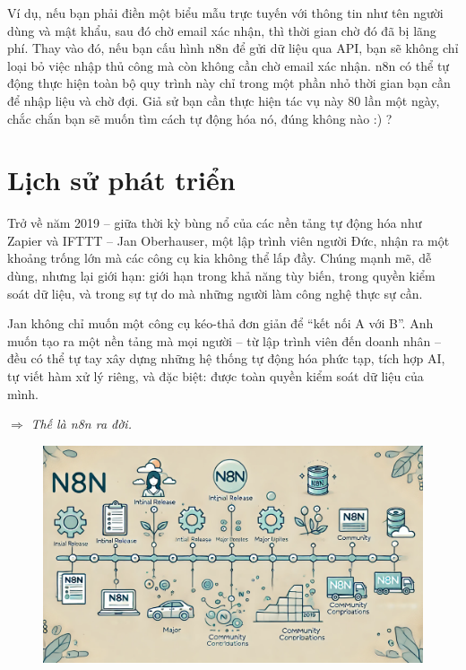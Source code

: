 Ví dụ, nếu bạn phải điền một biểu mẫu trực tuyến với thông tin như tên người dùng và mật khẩu, sau đó chờ email xác nhận, thì thời gian chờ đó đã bị lãng phí. Thay vào đó, nếu bạn cấu hình n8n để gửi dữ liệu qua API, bạn sẽ không chỉ loại bỏ việc nhập thủ công mà còn không cần chờ email xác nhận. n8n có thể tự động thực hiện toàn bộ quy trình này chỉ trong một phần nhỏ thời gian bạn cần để nhập liệu và chờ đợi. Giả sử bạn cần thực hiện tác vụ này 80 lần một ngày, chắc chắn bạn sẽ muốn tìm cách tự động hóa nó, đúng không nào :) ?



\section{Lịch sử phát triển}

Trở về năm 2019 – giữa thời kỳ bùng nổ của các nền tảng tự động hóa như Zapier và IFTTT – Jan Oberhauser, một lập trình viên người Đức, nhận ra một khoảng trống lớn mà các công cụ kia không thể lấp đầy. Chúng mạnh mẽ, dễ dùng, nhưng lại giới hạn: giới hạn trong khả năng tùy biến, trong quyền kiểm soát dữ liệu, và trong sự tự do mà những người làm công nghệ thực sự cần.

Jan không chỉ muốn một công cụ kéo-thả đơn giản để “kết nối A với B”. Anh muốn tạo ra một nền tảng mà mọi người – từ lập trình viên đến doanh nhân – đều có thể tự tay xây dựng những hệ thống tự động hóa phức tạp, tích hợp AI, tự viết hàm xử lý riêng, và đặc biệt: được toàn quyền kiểm soát dữ liệu của mình.

$\Rightarrow$ \textit{Thế là n8n ra đời.}

\newpage

\begin{figure}[htbp]
    \centering
    \includegraphics[width=1\linewidth]{images/history.png}
\end{figure}

